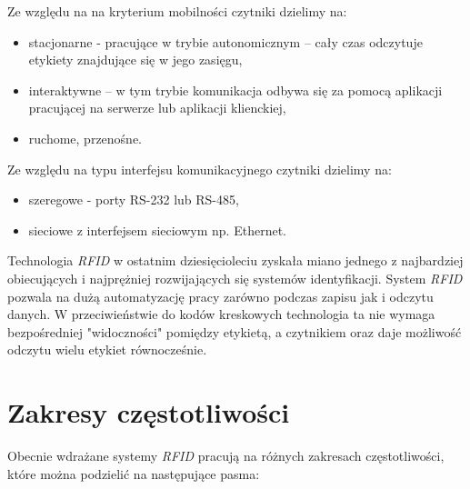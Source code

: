 \noindent 
\newline Ze względu na na kryterium mobilności czytniki dzielimy na:

\begin{itemize}\setlength{\itemsep}{0pt}

	\item stacjonarne - pracujące w trybie autonomicznym – cały czas odczytuje etykiety znajdujące się w jego zasięgu, 

	\item interaktywne – w tym trybie komunikacja odbywa się za pomocą aplikacji pracującej na serwerze lub aplikacji klienckiej, 

	\item ruchome, przenośne.
\end{itemize}




\noindent
\newline Ze względu na typu interfejsu komunikacyjnego czytniki dzielimy na:

\begin{itemize}\setlength{\itemsep}{0pt}

	\item szeregowe - porty RS-232 lub RS-485, 

	\item sieciowe z interfejsem sieciowym np. Ethernet.

\end{itemize}



Technologia \emph{RFID} w ostatnim dziesięcioleciu zyskała miano jednego z najbardziej obiecujących i najprężniej rozwijających się systemów identyfikacji.
System \emph{RFID} pozwala na dużą automatyzację pracy zarówno podczas zapisu jak i odczytu danych. W przeciwieństwie do kodów kreskowych technologia ta nie wymaga bezpośredniej "widoczności" pomiędzy etykietą, a czytnikiem oraz daje możliwość odczytu wielu etykiet równocześnie.


\section{Zakresy częstotliwości}

Obecnie wdrażane systemy \emph{RFID} pracują na różnych zakresach częstotliwości, które można podzielić na następujące pasma:


